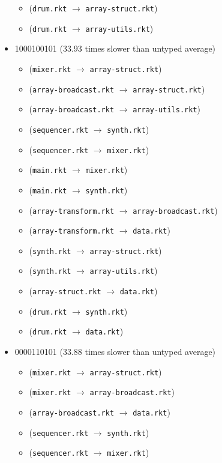 \documentclass{article}
\newcommand{\mono}[1]{\texttt{#1}}
\begin{document}
\begin{itemize}
\begin{itemize}
  \item (\mono{drum.rkt} $\rightarrow$ \mono{array-struct.rkt})
  \item (\mono{drum.rkt} $\rightarrow$ \mono{array-utils.rkt})
  \end{itemize}
\item 1000100101 (33.93 times slower than untyped average)
  \begin{itemize}
  \item (\mono{mixer.rkt} $\rightarrow$ \mono{array-struct.rkt})
  \item (\mono{array-broadcast.rkt} $\rightarrow$ \mono{array-struct.rkt})
  \item (\mono{array-broadcast.rkt} $\rightarrow$ \mono{array-utils.rkt})
  \item (\mono{sequencer.rkt} $\rightarrow$ \mono{synth.rkt})
  \item (\mono{sequencer.rkt} $\rightarrow$ \mono{mixer.rkt})
  \item (\mono{main.rkt} $\rightarrow$ \mono{mixer.rkt})
  \item (\mono{main.rkt} $\rightarrow$ \mono{synth.rkt})
  \item (\mono{array-transform.rkt} $\rightarrow$ \mono{array-broadcast.rkt})
  \item (\mono{array-transform.rkt} $\rightarrow$ \mono{data.rkt})
  \item (\mono{synth.rkt} $\rightarrow$ \mono{array-struct.rkt})
  \item (\mono{synth.rkt} $\rightarrow$ \mono{array-utils.rkt})
  \item (\mono{array-struct.rkt} $\rightarrow$ \mono{data.rkt})
  \item (\mono{drum.rkt} $\rightarrow$ \mono{synth.rkt})
  \item (\mono{drum.rkt} $\rightarrow$ \mono{data.rkt})
  \end{itemize}
\item 0000110101 (33.88 times slower than untyped average)
  \begin{itemize}
  \item (\mono{mixer.rkt} $\rightarrow$ \mono{array-struct.rkt})
  \item (\mono{mixer.rkt} $\rightarrow$ \mono{array-broadcast.rkt})
  \item (\mono{array-broadcast.rkt} $\rightarrow$ \mono{data.rkt})
  \item (\mono{sequencer.rkt} $\rightarrow$ \mono{synth.rkt})
  \item (\mono{sequencer.rkt} $\rightarrow$ \mono{mixer.rkt})

\end{itemize}
\end{itemize}
\end{document}
